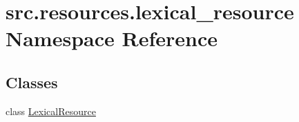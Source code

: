 \hypertarget{namespacesrc_1_1resources_1_1lexical__resource}{\section{src.\+resources.\+lexical\+\_\+resource Namespace Reference}
\label{namespacesrc_1_1resources_1_1lexical__resource}
}
\subsection*{Classes}
\begin{DoxyCompactItemize}
\item 
class \hyperlink{classsrc_1_1resources_1_1lexical__resource_1_1_lexical_resource}{Lexical\+Resource}
\end{DoxyCompactItemize}
